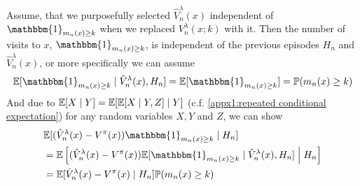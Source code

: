 Assume, that we purposefully selected \(\hat{V}_n^\lambda(x)\) independent of \(\mathbbm{1}_{m_n(x)\ge k}\) when we replaced \(V_n^\lambda(x;k)\) with it. Then the number of visits to \(x\), \(\mathbbm{1}_{m_n(x)\ge k}\), is independent of the previous episodes \(H_n\) and \(\hat{V}_n^\lambda(x)\), or more specifically we can assume
\[
    \E[\mathbbm{1}_{m_n(x)\ge k}\mid \hat{V}_n^\lambda(x), H_n]=\E[\mathbbm{1}_{m_n(x)\ge k}]=\Pr(m_n(x)\ge k)
\]
And due to \(\mathbb{E}[X\mid Y]=\mathbb{E}[\mathbb{E}[X\mid Y, Z] \mid Y]\) (c.f. \ref{appx1:repeated conditional expectation}) for any random variables \(X,Y\) and \(Z\), we can show
\begin{align*}
    &\E[(\hat{V}_n^\lambda(x)-V^\pi(x)) \mathbbm{1}_{m_n(x)\ge k}\mid H_n]\\
    &=\E\left[(\hat{V}_n^\lambda(x)-V^\pi(x)) \E[\mathbbm{1}_{m_n(x)\ge k}\mid \hat{V}_n^\lambda(x), H_n]\;\middle|\; H_n\right]\\
    &=\E[\hat{V}_n^\lambda(x)-V^\pi(x)\mid H_n]\Pr(m_n(x)\ge k)
\end{align*}
